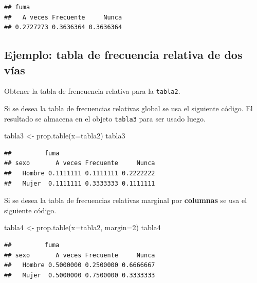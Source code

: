 \documentclass[
]{book}
\makeatletter
\newenvironment{Shaded}{\begin{snugshade}}{\end{snugshade}}
\newcommand{\AttributeTok}[1]{\textcolor[rgb]{0.77,0.63,0.00}{#1}}
\newcommand{\DecValTok}[1]{\textcolor[rgb]{0.00,0.00,0.81}{#1}}
\newcommand{\FunctionTok}[1]{\textcolor[rgb]{0.00,0.00,0.00}{#1}}
\newcommand{\NormalTok}[1]{#1}
\newcommand{\OtherTok}[1]{\textcolor[rgb]{0.56,0.35,0.01}{#1}}
\newenvironment{kframe}{%
\medskip{}
\setlength{\fboxsep}{.8em}
 \def\at@end@of@kframe{}%
 \ifinner\ifhmode%
  \def\at@end@of@kframe{\end{minipage}}%
  \begin{minipage}{\columnwidth}%
 \fi\fi%
 \def\FrameCommand##1{\hskip\@totalleftmargin \hskip-\fboxsep
 \colorbox{shadecolor}{##1}\hskip-\fboxsep
     \hskip-\linewidth \hskip-\@totalleftmargin \hskip\columnwidth}%
 \MakeFramed {\advance\hsize-\width
   \@totalleftmargin\z@ \linewidth\hsize
   \@setminipage}}%
 {\par\unskip\endMakeFramed%
 \at@end@of@kframe}
\renewenvironment{Shaded}{\begin{kframe}}{\end{kframe}}
\makeatother
\begin{document}
\begin{verbatim}
## fuma
##   A veces Frecuente     Nunca 
## 0.2727273 0.3636364 0.3636364
\end{verbatim}

\hypertarget{ejemplo-tabla-de-frecuencia-relativa-de-dos-vuxedas}{%
\subsection*{Ejemplo: tabla de frecuencia relativa de dos vías}\label{ejemplo-tabla-de-frecuencia-relativa-de-dos-vuxedas}}

Obtener la tabla de frencuencia relativa para la \texttt{tabla2}.

Si se desea la tabla de frecuencias relativas global se usa el siguiente código. El resultado se almacena en el objeto \texttt{tabla3} para ser usado luego.

\begin{Shaded}
\begin{Highlighting}[]
\NormalTok{tabla3 }\OtherTok{\textless{}{-}} \FunctionTok{prop.table}\NormalTok{(}\AttributeTok{x=}\NormalTok{tabla2)}
\NormalTok{tabla3}
\end{Highlighting}
\end{Shaded}

\begin{verbatim}
##         fuma
## sexo       A veces Frecuente     Nunca
##   Hombre 0.1111111 0.1111111 0.2222222
##   Mujer  0.1111111 0.3333333 0.1111111
\end{verbatim}

Si se desea la tabla de frecuencias relativas marginal por \textbf{columnas} se usa el siguiente código.

\begin{Shaded}
\begin{Highlighting}[]
\NormalTok{tabla4 }\OtherTok{\textless{}{-}} \FunctionTok{prop.table}\NormalTok{(}\AttributeTok{x=}\NormalTok{tabla2, }\AttributeTok{margin=}\DecValTok{2}\NormalTok{)}
\NormalTok{tabla4}
\end{Highlighting}
\end{Shaded}

\begin{verbatim}
##         fuma
## sexo       A veces Frecuente     Nunca
##   Hombre 0.5000000 0.2500000 0.6666667
##   Mujer  0.5000000 0.7500000 0.3333333
\end{verbatim}
\end{document}
